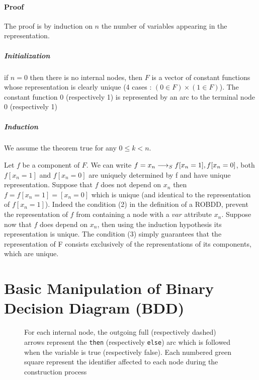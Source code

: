 \documentclass[a4paper,10pt]{article}
\newcommand{\includeframe}[4]{\makebox[#2\linewidth]{\texttt{[image: \#4]}}}
\begin{document}
\paragraph{Proof\\}
The proof is by induction on $n$ the number of variables appearing in the representation.
\subparagraph{Initialization\\}
if $n=0$ then there is no internal nodes, then $F$ is a vector of constant functions whose representation is clearly unique (4 cases : $(0\in F) \times (1\in F)$).
The constant function 0 (respectively 1) is represented by an arc to the terminal node 0 (respectively 1)
\subparagraph{Induction\\}
We assume the theorem true for any $0 \leq k < n$.

Let $f$ be a component of $F$. We can write $f = x_n \longrightarrow_S f[x_n=1], f[x_n=0]$, both $f[x_n=1]$ and $f[x_n=0]$ are uniquely determined by f and have unique representation.
Suppose that $f$ does not depend on $x_n$ then $f=f[x_n=1]=[x_n=0]$ which is unique (and identical to the representation of $f[x_n=1]$).
Indeed the condition (2) in the definition of a ROBDD, prevent the representation of $f$ from containing a node with a $var$ attribute $x_n$.
Suppose now that $f$ does depend on $x_n$, then using the induction hypothesis its representation is unique.
The condition (3) simply guarantees that the representation of F consists exclusively of the representations of its components, which are unique.


\section{Basic Manipulation of Binary Decision Diagram (BDD)}


\begin{figure}
\centering
\includeframe{1}{1}{}{draws.pdf}
\caption{For each internal node, the outgoing full (respectively dashed) arrows represent the \texttt{then} (respectively \texttt{else}) arc which is followed when the variable is true (respectively false). Each numbered green square represent the identifier affected to each node during the construction process}
\label{draws1}
\end{figure}
\end{document}
